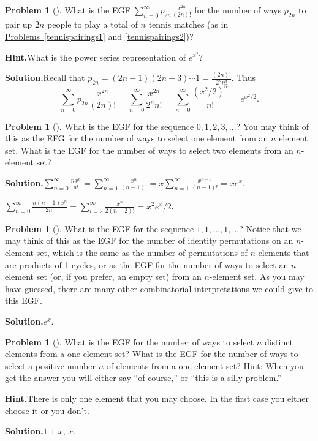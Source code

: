 \documentclass[10pt,]{book}
\theoremstyle{plain}
\theoremstyle{definition}
\newtheorem{activity}[project]{Problem}
\theoremstyle{definition}
\numberwithin{equation}{chapter}
\begin{document}
\begin{activity}[]\label{exponentialtennisparings}
What is the EGF \(\sum_{n=0}^\infty
p_{2n}\frac{x^{2n}}{(2n)!}\) for the number of ways \(p_{2n}\) to pair up \(2n\) people to play a total of \(n\) tennis matches (as in \hyperref[tennispairings1]{Problems~\ref{tennispairings1}} and \hyperref[tennispairings2]{\ref{tennispairings2}})?%
\par\medskip\noindent%
\textbf{Hint.}\quad What is the power series representation of \(e^{x^2}\)?%
\par\medskip\noindent%
\textbf{Solution.}\quad Recall that \(p_{2n} = (2n-1)(2n-3)\cdots 1= \frac{(2n)!}{2^n
n!}\). Thus%
\begin{equation*}
\sum_{n=0}^\infty
p_{2n}\frac{x^{2n}}{(2n)!}= \sum_{n=0}^\infty \frac{x^{2n}}{2^n n!} =
\sum_{n=0}^\infty \frac{({x^2/2})^n}{n!} = e^{x^2/2} .
\end{equation*}
%
\end{activity}
\begin{activity}[]\label{activity-379}
What is the EGF for the sequence \(0,1,2,3,\ldots\)? You may think of this as the EFG for the number of ways to select one element from an \(n\) element set. What is the EGF for the number of ways to select two elements from an \(n\)-element set?%
\par\medskip\noindent%
\textbf{Solution.}\quad \(\sum_{n=0}^\infty\frac{nx^n}{n!}=\sum_{n=1}^\infty\frac{x^n}{(n-1)!}=x\sum_{n=1}^\infty\frac{x^{n-1}}{(n-1)!}=xe^x\).%
\par
\(\sum_{n=0}^\infty\frac{n(n-1)x^n}{2 n!}=\sum_{i=2}^\infty \frac{x^n}{2(n-2)!}=x^2e^x/2\).%
\end{activity}
\begin{activity}[]\label{allonessequence}
What is the EGF for the sequence \(1,1,\ldots,1,\ldots\)? Notice that we may think of this as the EGF for the number of identity permutations on an \(n\)-element set, which is the same as the number of permutations of \(n\) elements that are products of 1-cycles, or as the EGF for the number of ways to select an \(n\)-element set (or, if you prefer, an empty set) from an \(n\)-element set. As you may have guessed, there are many other combinatorial interpretations we could give to this EGF.%
\par\medskip\noindent%
\textbf{Solution.}\quad \(e^x\).%
\end{activity}
\begin{activity}[]\label{activity-381}
What is the EGF for the number of ways to select \(n\) distinct elements from a one-element set? What is the EGF for the number of ways to select a positive number \(n\) of elements from a one element set?  Hint: When you get the answer you will either say ``of course,'' or ``this is a silly problem.''%
\par\medskip\noindent%
\textbf{Hint.}\quad There is only one element that you may choose. In the first case you either choose it or you don't.%
\par\medskip\noindent%
\textbf{Solution.}\quad \(1+x\), \(x\).%
\end{activity}
\end{document}
